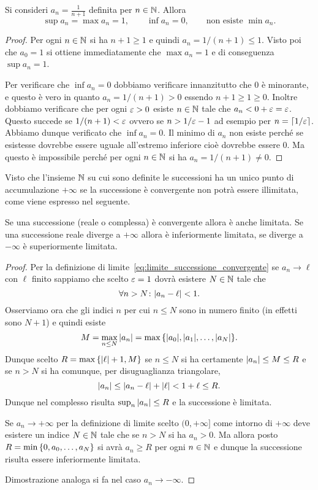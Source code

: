 \begin{example}
Si consideri $a_n = \frac{1}{n+1}$ definita per $n\in {\mathbb N}$.
Allora
\[
  \sup a_n = \max a_n = 1, \qquad
  \inf a_n = 0, \qquad \text{non esiste }\min a_n.
\]
\end{example}
\begin{proof}
Per ogni $n \in {\mathbb N}$ si ha $n+1\ge 1$ e quindi $a_n = 1/(n+1) \le 1$.
Visto poi che $a_0 = 1$ si ottiene immediatamente che $\max a_n = 1$
e di conseguenza $\sup a_n = 1$.

Per verificare che $\inf a_n = 0$ dobbiamo verificare innanzitutto
che $0$ è minorante, e questo è vero in quanto $a_n = 1/(n+1)> 0$ essendo $n+1\ge 1 \ge 0$.
Inoltre dobbiamo verificare che per ogni $\varepsilon >0$ esiste $n\in {\mathbb N}$ tale
che $a_n < 0 + \varepsilon = \varepsilon$. Questo succede se $1/(n+1) < \varepsilon$ ovvero
se $n > 1/\varepsilon -1$ ad esempio per $n=\lceil 1/\varepsilon\rceil$.
Abbiamo dunque verificato che $\inf a_n = 0$.
Il minimo di $a_n$ non esiste perché se esistesse dovrebbe essere uguale
all'estremo inferiore cioè dovrebbe essere $0$. Ma questo è impossibile
perché per ogni $n\in {\mathbb N}$ si ha $a_n = 1/(n+1)\neq 0$.
\end{proof}

Visto che l'insieme ${\mathbb N}$ su cui sono definite le successioni 
ha un unico punto di accumulazione $+\infty$ se la successione 
è convergente non potrà essere illimitata, come viene espresso nel seguente.

\begin{theorem}
\mymark{**}%
Se una successione (reale o complessa) è convergente allora è anche limitata.
Se una successione reale diverge a $+\infty$ allora è inferiormente limitata,
se diverge a $-\infty$ è superiormente limitata.
\end{theorem}
%
\begin{proof}
  Per la definizione di limite~\eqref{eq:limite_successione_convergente} 
  se $a_n\to \ell$ con $\ell$ finito sappiamo 
  che scelto $\varepsilon=1$ dovrà esistere $N\in {\mathbb N}$ tale che 
  \[
      \forall n>N\colon {\left|a_n - \ell\right|} < 1.
  \]
  Osserviamo ora che gli indici $n$ per cui $n\le N$ sono in numero finito 
  (in effetti sono $N+1$) e quindi esiste
  \[
   M = \max_{n\le N} {\left|a_n\right|} 
   = \max {\left\{ {\left|a_0\right|}, {\left|a_1\right|}, \dots , {\left|a_N\right|} \right\}}.  
  \]
  Dunque scelto $R=\max{\left\{ {\left|\ell\right|}+1,M \right\}}$ 
  se $n\le N$ si ha certamente ${\left|a_n\right|}\le M \le R$
  e se $n>N$ si ha comunque, per disuguaglianza triangolare,
  \[
  {\left|a_n\right|} \le {\left|a_n-\ell\right|} + {\left|\ell\right|} < 1+ \ell \le R.  
  \]
  Dunque nel complesso risulta $\sup_n {\left|a_n\right|}\le R$ e la successione 
  è limitata.

  Se $a_n\to +\infty$ per la definizione di limite 
  scelto $(0,+\infty]$ come intorno di $+\infty$ 
  deve esistere un indice $N\in {\mathbb N}$ tale che se $n>N$ si ha $a_n>0$. 
  Ma allora posto $R=\min{\left\{ 0, a_0,\dots,a_N \right\}}$
  si avrà $a_n\ge R$ per ogni $n\in {\mathbb N}$ e dunque la successione 
  risulta essere inferiormente limitata.

  Dimostrazione analoga si fa nel caso $a_n\to -\infty$.
\end{proof}



